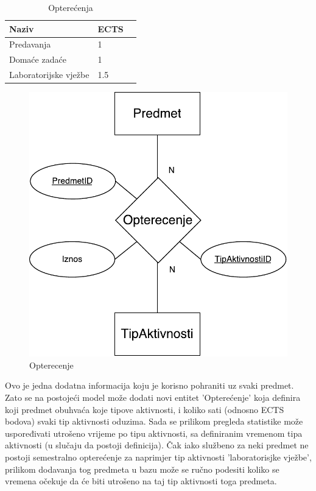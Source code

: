 \documentclass[times, utf8, zavrsni]{fer}
\begin{document}
\begin{table}[H]
\caption{Opterećenja}
\label{tbl:opterecenja}
\centering
\begin{tabular}{llr} \hline
Naziv & ECTS\\ \hline
Predavanja & 1 \\
Domaće zadaće & 1 \\
Laboratorijske vježbe & 1.5 \\ \hline
\end{tabular}
\end{table}

\begin{figure}[H]
\centering
\includegraphics{img/opterecenje.pdf}
\caption{Opterecenje}
\label{fig:opterecenje}
\end{figure}

Ovo je jedna dodatna informacija koju je korisno pohraniti uz svaki predmet. Zato se na postojeći model može dodati novi entitet 'Opterećenje' koja definira koji predmet obuhvaća koje tipove aktivnosti, i koliko sati (odnosno ECTS bodova) svaki tip aktivnosti oduzima. Sada se prilikom pregleda statistike može uspoređivati utrošeno vrijeme po tipu aktivnosti, sa definiranim vremenom tipa aktivnosti (u slučaju da postoji definicija). Čak iako službeno za neki predmet ne postoji semestralno opterećenje za naprimjer tip aktivnosti 'laboratorisjke vježbe', prilikom dodavanja tog predmeta u bazu može se ručno podesiti koliko se vremena očekuje da će biti utrošeno na taj tip aktivnosti toga predmeta.
\end{document}
